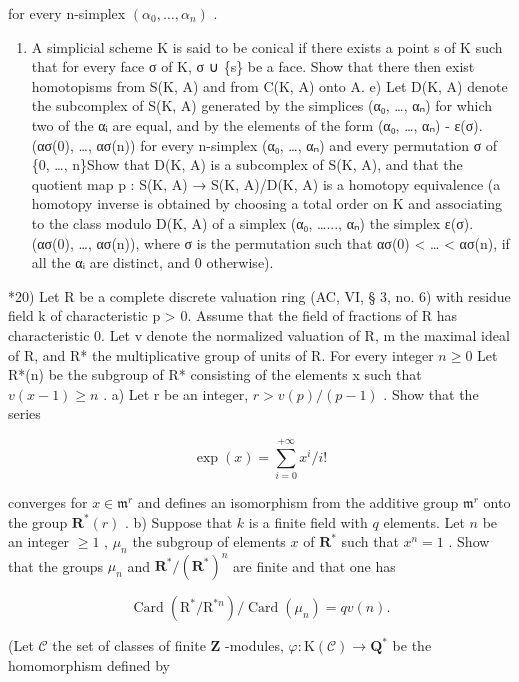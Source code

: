 for every n-simplex \((\alpha_{0}, \ldots, \alpha_{n})\) .

\begin{enumerate}
\def\labelenumi{\alph{enumi})}
\setcounter{enumi}{3}
\tightlist
\item
  A simplicial scheme K is said to be conical if there exists a point s of K such that for every face σ of K, σ ∪ \{s\} be a face. Show that there then exist homotopisms from S(K, A) and from C(K, A) onto A. e) Let D(K, A) denote the subcomplex of S(K, A) generated by the simplices (α₀, \ldots, αₙ) for which two of the αᵢ are equal, and by the elements of the form (α₀, \ldots, αₙ) - ε(σ). (ασ(0), \ldots, ασ(n)) for every n-simplex (α₀, \ldots, αₙ) and every permutation σ of \{0, \ldots, n\}Show that D(K, A) is a subcomplex of S(K, A), and that the quotient map p : S(K, A) → S(K, A)/D(K, A) is a homotopy equivalence (a homotopy inverse is obtained by choosing a total order on K and associating to the class modulo D(K, A) of a simplex (α₀, \ldots..., αₙ) the simplex ε(σ). (ασ(0), \ldots, ασ(n)), where σ is the permutation such that ασ(0) \textless{} \ldots{} \textless{} ασ(n), if all the αᵢ are distinct, and 0 otherwise).
\end{enumerate}

*20) Let R be a complete discrete valuation ring (AC, VI, § 3, no. 6) with residue field k of characteristic p \textgreater{} 0. Assume that the field of fractions of R has characteristic 0. Let v denote the normalized valuation of R, m the maximal ideal of R, and R* the multiplicative group of units of R. For every integer \(n \geqslant 0\) Let R*(n) be the subgroup of R* consisting of the elements x such that \(v(x - 1) \geqslant n\) . a) Let r be an integer, \(r > v(p)/(p - 1)\) . Show that the series

\[
\exp (x) = \sum_ {i = 0} ^ {+ \infty} x ^ {i} / i!
\]

converges for \(x \in \mathfrak{m}^r\) and defines an isomorphism from the additive group \(\mathfrak{m}^r\) onto the group \(\mathbf{R}^*(r)\) . b) Suppose that \(k\) is a finite field with \(q\) elements. Let \(n\) be an integer \(\geqslant 1\) , \(\mu_n\) the subgroup of elements \(x\) of \(\mathbf{R}^*\) such that \(x^n = 1\) . Show that the groups \(\mu_n\) and \(\mathbf{R}^*/(\mathbf{R}^*)^n\) are finite and that one has

\[
\operatorname{Card} \left(\mathrm{R} ^ {*} / \mathrm{R} ^ {* n}\right) / \operatorname{Card} \left(\mu_ {n}\right) = q v (n).
\]

(Let \(\mathcal{C}\) the set of classes of finite \(\mathbf{Z}\) -modules, \(\varphi : \mathrm{K}(\mathcal{C}) \to \mathbf{Q}^*\) be the homomorphism defined by

